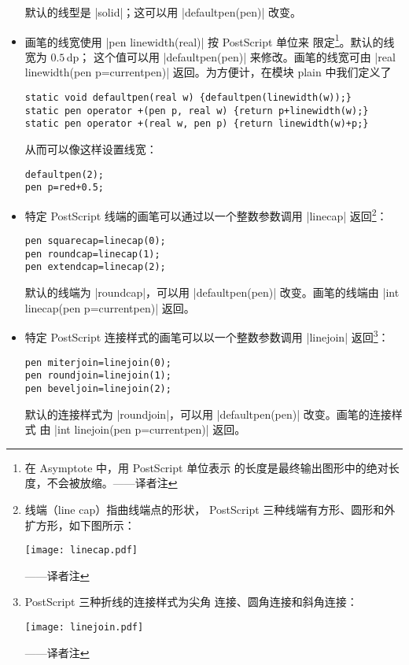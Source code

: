 \documentclass{ctexbook}
\newcommand*\prgname[1]{\textsf{#1}}
\newcommand\transnote[1]{\footnote{#1——译者注}}
\begin{document}
\begin{itemize}
  默认的线型是 |solid|；这可以用 |defaultpen(pen)| 改变。

\item 画笔的线宽使用 |pen linewidth(real)| 按 \prgname{PostScript} 单位来
  限定\transnote{在 \prgname{Asymptote} 中，用 \prgname{PostScript} 单位表示
  的长度是最终输出图形中的绝对长度，不会被放缩。}。默认的线宽为 $0.5$\,dp；
  这个值可以用 |defaultpen(pen)| 来修改。画笔的线宽可由
  |real linewidth(pen p=currentpen)| 返回。为方便计，在模块 \prgname{plain}
  中我们定义了
\begin{lstlisting}
static void defaultpen(real w) {defaultpen(linewidth(w));}
static pen operator +(pen p, real w) {return p+linewidth(w);}
static pen operator +(real w, pen p) {return linewidth(w)+p;}
\end{lstlisting}
  从而可以像这样设置线宽：
\begin{lstlisting}
defaultpen(2);
pen p=red+0.5;
\end{lstlisting}

\item 特定 \prgname{PostScript} 线端的画笔可以通过以一个整数参数调用
  |linecap| 返回\transnote{线端（line cap）指曲线端点的形状，
  \prgname{PostScript} 三种线端有方形、圆形和外扩方形，如下图所示：
  \begin{center}\texttt{[image: linecap.pdf]}\end{center}}：
\begin{lstlisting}
pen squarecap=linecap(0);
pen roundcap=linecap(1);
pen extendcap=linecap(2);
\end{lstlisting}
  默认的线端为 |roundcap|，可以用 |defaultpen(pen)| 改变。画笔的线端由
  |int linecap(pen p=currentpen)| 返回。

\item 特定 \prgname{PostScript} 连接样式的画笔可以以一个整数参数调用
  |linejoin| 返回\transnote{\prgname{PostScript} 三种折线的连接样式为尖角
  连接、圆角连接和斜角连接：\begin{center}\texttt{[image: linejoin.pdf]}\end{center}}：
\begin{lstlisting}
pen miterjoin=linejoin(0);
pen roundjoin=linejoin(1);
pen beveljoin=linejoin(2);
\end{lstlisting}
  默认的连接样式为 |roundjoin|，可以用 |defaultpen(pen)| 改变。画笔的连接样式
  由 |int linejoin(pen p=currentpen)| 返回。


\end{itemize}
\end{document}
